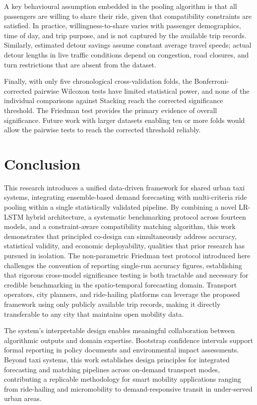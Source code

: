 \documentclass[a4paper,fleqn]{cas-dc}
\begin{document}
A key behavioural assumption embedded in the pooling algorithm is that all passengers are willing to share their ride, given that compatibility constraints are satisfied.  In practice, willingness-to-share varies with passenger demographics, time of day, and trip purpose, and is not captured by the available trip records.  Similarly, estimated detour savings assume constant average travel speeds; actual detour lengths in live traffic conditions depend on congestion, road closures, and turn restrictions that are absent from the dataset.

Finally, with only five chronological cross-validation folds, the Bonferroni-corrected pairwise Wilcoxon tests have limited statistical power, and none of the individual comparisons against Stacking reach the corrected significance threshold.  The Friedman test provides the primary evidence of overall significance.  Future work with larger datasets enabling ten or more folds would allow the pairwise tests to reach the corrected threshold reliably.

\FloatBarrier
\section{Conclusion}
\label{sec:conclusion}

This research introduces a unified data-driven framework for shared urban taxi systems, integrating ensemble-based demand forecasting with multi-criteria ride pooling within a single statistically validated pipeline.  By combining a novel LR-LSTM hybrid architecture, a systematic benchmarking protocol across fourteen models, and a constraint-aware compatibility matching algorithm, this work demonstrates that principled co-design can simultaneously address accuracy, statistical validity, and economic deployability, qualities that prior research has pursued in isolation.  The non-parametric Friedman test protocol introduced here challenges the convention of reporting single-run accuracy figures, establishing that rigorous cross-model significance testing is both tractable and necessary for credible benchmarking in the spatio-temporal forecasting domain.  Transport operators, city planners, and ride-hailing platforms can leverage the proposed framework using only publicly available trip records, making it directly transferable to any city that maintains open mobility data.

The system's interpretable design enables meaningful collaboration between algorithmic outputs and domain expertise.  Bootstrap confidence intervals support formal reporting in policy documents and environmental impact assessments.  Beyond taxi systems, this work establishes design principles for integrated forecasting and matching pipelines across on-demand transport modes, contributing a replicable methodology for smart mobility applications ranging from ride-hailing and micromobility to demand-responsive transit in under-served urban areas.
\end{document}
